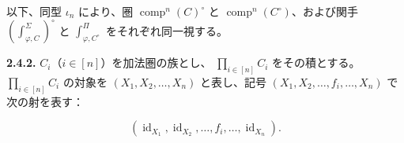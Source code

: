 以下、同型 $\iota_n$ により、圏
$\operatorname{comp}^{n}(C)^\circ$ と
$\operatorname{comp}^{n}(C^\circ)$、および関手
$\left(\int_{\varphi,C}^{\Sigma}\right)^\circ$ と
$\int_{\varphi,C^\circ}^{\Pi}$ をそれぞれ同一視する。

\noindent\textbf{2.4.2.}\quad
$C_i$（$i\in[n]$）を加法圏の族とし、
$\prod_{i\in[n]}C_i$ をその積とする。
$\prod_{i\in[n]}C_i$ の対象を $(X_1,X_2,\ldots,X_n)$ と表し、記号
$(X_1,X_2,\ldots,f_i,\ldots,X_n)$ で次の射を表す：

\begin{equation*}
  (\operatorname{id}_{X_1},\operatorname{id}_{X_2},\ldots,
  f_i,\ldots,\operatorname{id}_{X_n}).
\end{equation*}
